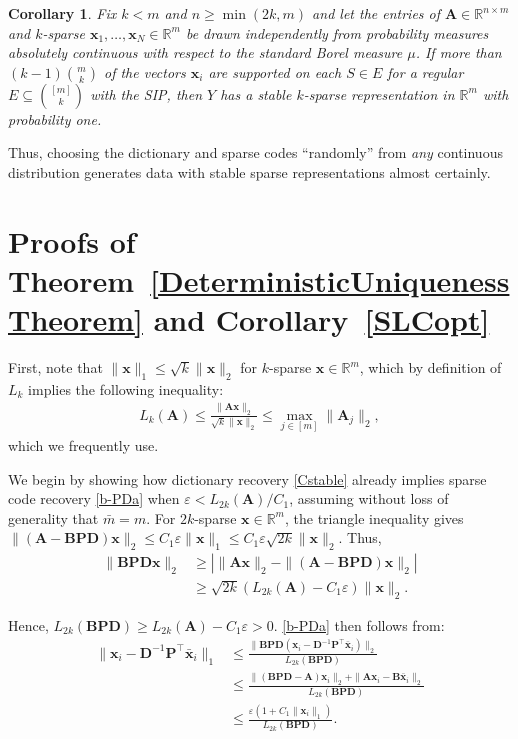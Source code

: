 \documentclass[9pt,twocolumn]{pnas-new}
\newtheorem{corollary}{Corollary}
\begin{document}
\begin{corollary}\label{ProbabilisticCor}
Fix $k < m$ and $n \geq \min(2k, m)$ 
and let the entries of $\mathbf{A} \in \mathbb{R}^{n \times m}$ and $k$-sparse $\mathbf{x}_1, \ldots, \mathbf{x}_N \in \mathbb{R}^m$ be drawn independently from probability measures absolutely continuous with respect to the standard Borel measure $\mu$. If more than $(k-1){m \choose k}$ of the vectors $\mathbf{x}_i$ are supported on each $S \in E$ for a regular $E \subseteq {[m] \choose k}$ with the SIP, then $Y$ has a stable $k$-sparse representation in $\mathbb{R}^m$ with probability one.
\end{corollary}

Thus, choosing the dictionary and sparse codes ``randomly'' from \emph{any} continuous distribution generates data with stable sparse representations almost certainly.

\section{Proofs of Theorem~\ref{DeterministicUniquenessTheorem} and Corollary~\ref{SLCopt}}\label{DUT}

First, note that $\|\mathbf{x}\|_1 \leq \sqrt{k} \|\mathbf{x}\|_2$ for $k$-sparse $\mathbf{x} \in \mathbb{R}^m$, which by definition of $L_k$ implies the following inequality:
\begin{align}\label{delrho}
L_k(\mathbf{A}) \leq \frac{\|\mathbf{A}\mathbf{x}\|_2}{\sqrt{k} \|\mathbf{x}\|_2} 
\leq  \max_{j \in [m]}\|\mathbf{A}_j\|_2,
\end{align}
which we frequently use.

We begin by showing how dictionary recovery \eqref{Cstable} already implies sparse code recovery \eqref{b-PDa} when \mbox{$\varepsilon < L_{2k}(\mathbf{A}) / C_1$}, assuming without loss of generality that $\bar m = m$. For $2k$-sparse $\mathbf{x} \in \mathbb{R}^m$, the triangle inequality gives \mbox{$\|(\mathbf{A}-\mathbf{BPD})\mathbf{x}\|_2  \leq C_1\varepsilon \|\mathbf{x}\|_1 \leq C_1 \varepsilon \sqrt{2k}  \|\mathbf{x}\|_2$}. Thus, 
\begin{align*}
\|\mathbf{BPD}\mathbf{x}\|_2 
&\geq | \|\mathbf{A}\mathbf{x}\|_2 - \|(\mathbf{A}-\mathbf{BPD})\mathbf{x}\|_2 | \\
&\geq \sqrt{2k} (L_{2k}(\mathbf{A}) -  C_1\varepsilon) \|\mathbf{x}\|_2.
\end{align*}

Hence, $L_{2k}(\mathbf{BPD}) \geq L_{2k}(\mathbf{A}) - C_1\varepsilon  > 0$. \eqref{b-PDa} then follows from:
\begin{align*}
\|\mathbf{x}_i - \mathbf{D}^{-1}\mathbf{P}^{\top}\mathbf{\bar x}_i \|_1
&\leq \frac{\|\mathbf{BPD}(\mathbf{x}_i - \mathbf{D}^{-1}\mathbf{P}^{\top}\mathbf{\bar x}_i)\|_2}{L_{2k}(\mathbf{BPD})} \\
&\leq \frac{\|(\mathbf{BPD} - \mathbf{A})\mathbf{x}_i\|_2 + \|\mathbf{A}\mathbf{x}_i - \mathbf{B}\mathbf{\bar x}_i\|_2}{L_{2k}(\mathbf{BPD})} \\
&\leq \frac{\varepsilon (1 + C_1 \|\mathbf{x}_i\|_1)}{L_{2k}(\mathbf{BPD})}.
\end{align*}
\end{document}
